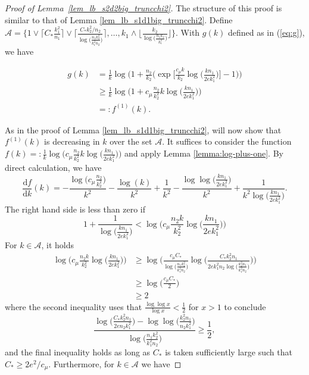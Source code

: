 \documentclass{article}
\newcommand{\D}{\textrm{d}}
\newcommand{\cA}{\mathcal{A}}
\newcommand{\Ct}{C_{*}}
\begin{document}
\begin{proof}[Proof of Lemma~\ref{lem_lb_s2d2big_truncchi2}]
    The structure of this proof is similar to that of Lemma \ref{lem_lb_s1d1big_truncchi2}. Define $\cA = \{ 1 \vee \lceil\Ct \frac{k_1^2}{n_1} \rceil \vee \Big\lceil \frac{\Ct k_2^2/n_2}{\log\big(\frac{n_1k_2^2}{k_1^2n_2}\big)}\Big\rceil, \dots , k_1 \wedge \lfloor\frac{k_2}{\log\big(\frac{n_1k_2}{k_1^2}\big)} \rfloor \}$. With $g(k)$ defined as in (\ref{eq:g}), we have 

    \begin{align*}
        g(k) &= \frac{1}{k}\log\Bigg(1 + \frac{n_2}{k_2}\bigg(\exp\Big[\frac{c_\mu k}{k_2}\log\big(\frac{kn_1}{2ek_1^2}\big)\Big] - 1\bigg)\Bigg) \\
        &\geq \frac{1}{k}\log\Bigg(1 + c_\mu\frac{n_2}{k^2_2}k\log\Big(\frac{kn_1}{2ek_1^2}\Big)\Bigg) \\
        &=: f^{(1)}(k).
    \end{align*}

    As in the proof of Lemma \ref{lem_lb_s1d1big_truncchi2}, will now show that $f^{(1)}(k)$ is decreasing in $k$ over the set $\cA$. It suffices to consider the function $f(k) =: \frac{1}{k}\log\Big(c_\mu\frac{n_2}{k^2_2}k\log\big(\frac{kn_1}{2ek_1^2}\big)\Big)$ and apply Lemma \ref{lemma:log-plus-one}. By direct calculation, we have
    \[\frac{\D f}{\D k}(k) = -\frac{\log\big(c_\mu\frac{n_2}{k_2^2}\big)}{k^2} - \frac{\log(k)}{k^2} + \frac{1}{k^2} - \frac{\log \log \big(\frac{kn_1}{2ek_1^2}\big)}{k^2} + \frac{1}{k^2\log\big(\frac{kn_1}{2ek_1^2}\big)}.\]
    The right hand side is less than zero if 
    \[1 + \frac{1}{\log\big(\frac{kn_1}{2ek_1^2}\big)} < \log\Big(c_\mu\frac{n_2k}{k_2^2}\log \big(\frac{kn_1}{2ek_1^2}\big)\Big)\]
    For $k \in \cA$, it holds 
    \begin{align*}
        \log\Big(c_\mu\frac{n_2k}{k_2^2} \log \big(\frac{kn_1}{2ek_1^2}\big)\Big) 
        &\geq \log\Bigg(\frac{c_\mu \Ct}{\log\big(\frac{n_1k_2^2}{k_1^2n_2}\big)} \log \Big(\frac{\Ct k_2^2n_1}{2ek_1^2n_2\log\big(\frac{k_2^2n_1}{k_1^2n_2}\big)}\Big)\Bigg) \\
        &\geq \log\Big(\frac{c_\mu \Ct }{2} \Big) \\
        &\geq 2
    \end{align*}
    where the second inequality uses that $\frac{\log \log x}{\log x} < \frac12$ for $x > 1$ to conclude 
    $$\frac{\log\big(\frac{\Ct k_2^2n_1}{2en_2k_1^2}\big) - \log \log \big(\frac{k_2^2n_1}{n_2k_1^2}\big)}{\log \big(\frac{n_1k_2^2}{k_1^2n_2}\big)} \geq \frac12,$$
    and the final inequality holds as long as $\Ct$ is taken sufficiently large such that $\Ct \geq 2e^2 / c_\mu$. Furthermore, for $k \in \cA$ we have 


\end{proof}
\end{document}
